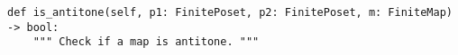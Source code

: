 \begin{verbatim}
def is_antitone(self, p1: FinitePoset, p2: FinitePoset, m: FiniteMap) -> bool:
    """ Check if a map is antitone. """
\end{verbatim}